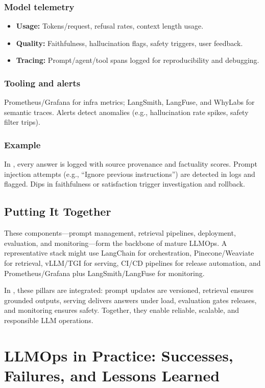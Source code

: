 \subsubsection{Model telemetry}
\begin{itemize}
    \item \textbf{Usage:} Tokens/request, refusal rates, context length usage.
    \item \textbf{Quality:} Faithfulness, hallucination flags, safety triggers, user feedback.
    \item \textbf{Tracing:} Prompt/agent/tool spans logged for reproducibility and debugging.
\end{itemize}

\subsubsection{Tooling and alerts}
Prometheus/Grafana for infra metrics; LangSmith, LangFuse, and WhyLabs for semantic traces. Alerts detect anomalies (e.g., hallucination rate spikes, safety filter trips).  

\subsubsection{Example}
In \ishtar{}, every answer is logged with source provenance and factuality scores. Prompt injection attempts (e.g., “Ignore previous instructions”) are detected in logs and flagged. Dips in faithfulness or satisfaction trigger investigation and rollback.  

\subsection*{Putting It Together}
These components---prompt management, retrieval pipelines, deployment, evaluation, and monitoring---form the backbone of mature LLMOps. A representative stack might use LangChain for orchestration, Pinecone/Weaviate for retrieval, vLLM/TGI for serving, CI/CD pipelines for release automation, and Prometheus/Grafana plus LangSmith/LangFuse for monitoring.  

In \ishtar{}, these pillars are integrated: prompt updates are versioned, retrieval ensures grounded outputs, serving delivers answers under load, evaluation gates releases, and monitoring ensures safety. Together, they enable reliable, scalable, and responsible LLM operations.

\section{LLMOps in Practice: Successes, Failures, and Lessons Learned}
\label{sec:llmops-practice}


